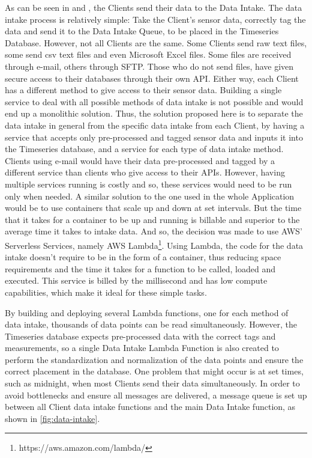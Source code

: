 As can be seen in  and , the Clients send their data to the Data Intake. The data intake process is relatively simple: Take the Client's sensor data, correctly tag the data and send it to the Data Intake Queue, to be placed in the Timeseries Database. 
However, not all Clients are the same. Some Clients send raw text files, some send \gls{csv} text files and even Microsoft Excel files. Some files are received through e-mail, others through SFTP. 
Those who do not send files, have given secure access to their databases through their own API.
Either way, each Client has a different method to give access to their sensor data. Building a single service to deal with all possible methods of data intake is not possible and would end up a monolithic solution. Thus, the solution proposed here is to separate the data intake in general from the specific data intake from each Client, by having a service that accepts only pre-processed and tagged sensor data and inputs it into the Timeseries database, and a service for each type of data intake method. Clients using e-mail would have their data pre-processed and tagged by a different service than clients who give access to their APIs.
However, having multiple services running is costly and so, these services would need to be run only when needed. A similar solution to the one used in the whole Application would be to use containers that scale up and down at set intervals. But the time that it takes for a container to be up and running is billable and superior to the average time it takes to intake data. And so, the decision was made to use AWS' Serverless Services, namely AWS Lambda\footnote{https://aws.amazon.com/lambda/\label{foot:lambda}}. Using Lambda, the code for the data intake doesn't require to be in the form of a container, thus reducing space requirements and the time it takes for a function to be called, loaded and executed. This service is billed by the millisecond and has low compute capabilities, which make it ideal for these simple tasks.

By building and deploying several Lambda functions, one for each method of data intake, thousands of data points can be read simultaneously. However, the Timeseries database expects pre-processed data with the correct tags and measurements, so a single Data Intake Lambda Function is also created to perform the standardization and normalization of the data points and ensure the correct placement in the database. One problem that might occur is at set times, such as midnight, when most Clients send their data simultaneously. In order to avoid bottlenecks and ensure all messages are delivered, a message queue is set up between all Client data intake functions and the main Data Intake function, as shown in \cref{fig:data-intake}.

